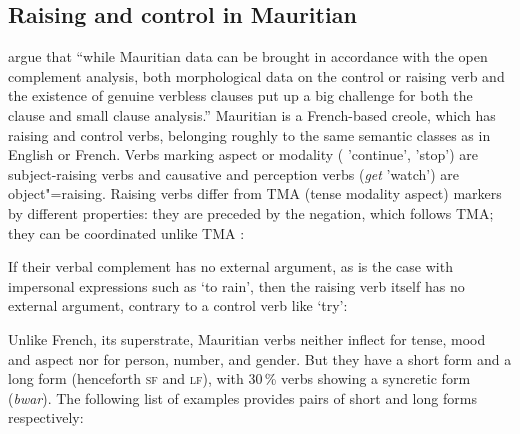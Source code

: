 \documentclass[output=paper
	        ,collection
	        ,collectionchapter
 	        ,biblatex
                ,babelshorthands
                ,newtxmath
                ,draftmode
                ,colorlinks, citecolor=brown
]{./langsci/langscibook}
\begin{document}
\subsection{Raising and control in Mauritian}

\citet[]{HenriandLaurens2011} argue that ``while Mauritian data can be brought in accordance with the open complement analysis, both morphological data on the control or raising verb and the existence of genuine verbless clauses put up a big challenge for both the clause and small clause analysis.''
Mauritian is a French-based creole, which has raising and control verbs, belonging roughly to the same semantic classes as in English or French. Verbs marking aspect or
modality ( 'continue',  'stop') are subject-raising verbs and causative and perception verbs (\emph{get} 'watch') are
object"=raising. Raising verbs differ from TMA (tense modality aspect) markers by different properties: they are preceded by
the negation, which follows TMA; they can be coordinated unlike TMA \citep[]{HenriandLaurens2011}:

\eal
{}
\zl
 
If their verbal complement has no external argument, as is the case with impersonal expressions such as  `to rain', then the raising verb itself has no external argument, contrary to a control verb like  `try':

\eal
{}
\zl

Unlike French, its superstrate, Mauritian verbs neither inflect for tense, mood and aspect nor for person, number, and
gender. But they have a short form and a long form (henceforth \textsc{sf} and \textsc{lf}), with
30\,\% verbs showing a syncretic form (\emph{bwar}). The following list of examples provides pairs of short and
long forms respectively:
\end{document}
